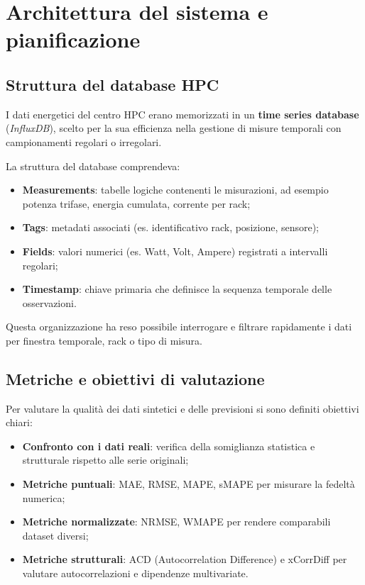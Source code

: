 \chapter{Architettura del sistema e pianificazione}

\section{Struttura del database HPC}

I dati energetici del centro HPC erano memorizzati in un \textbf{time series database} 
(\emph{InfluxDB}), scelto per la sua efficienza nella gestione di misure temporali 
con campionamenti regolari o irregolari.  

La struttura del database comprendeva:
\begin{itemize}
  \item \textbf{Measurements}: tabelle logiche contenenti le misurazioni, ad esempio 
  potenza trifase, energia cumulata, corrente per rack;
  \item \textbf{Tags}: metadati associati (es. identificativo rack, posizione, sensore);
  \item \textbf{Fields}: valori numerici (es. Watt, Volt, Ampere) registrati a intervalli regolari;
  \item \textbf{Timestamp}: chiave primaria che definisce la sequenza temporale delle osservazioni.
\end{itemize}

Questa organizzazione ha reso possibile interrogare e filtrare rapidamente i dati 
per finestra temporale, rack o tipo di misura.


\section{Metriche e obiettivi di valutazione}

Per valutare la qualità dei dati sintetici e delle previsioni si sono definiti obiettivi chiari:
\begin{itemize}
  \item \textbf{Confronto con i dati reali}: verifica della somiglianza statistica e 
  strutturale rispetto alle serie originali;
  \item \textbf{Metriche puntuali}: MAE, RMSE, MAPE, sMAPE per misurare la fedeltà numerica;
  \item \textbf{Metriche normalizzate}: NRMSE, WMAPE per rendere comparabili dataset diversi;
  \item \textbf{Metriche strutturali}: ACD (Autocorrelation Difference) e xCorrDiff per 
  valutare autocorrelazioni e dipendenze multivariate.
\end{itemize}

